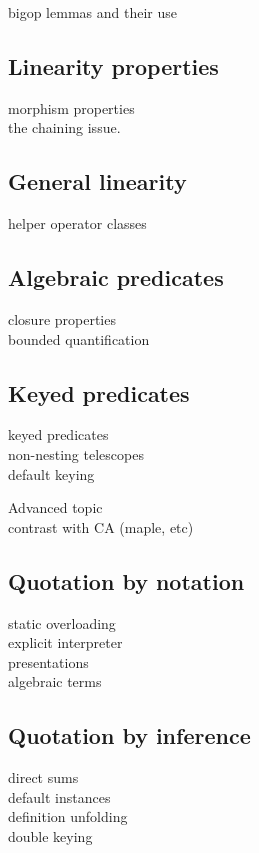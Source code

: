 bigop lemmas and their use

\subsection{Linearity properties}

morphism properties\\
the chaining issue.

\subsection{General linearity}

helper operator classes

\subsection{Algebraic predicates}

closure properties\\
bounded quantification

\subsection{Keyed predicates}

keyed predicates\\
non-nesting telescopes\\
default keying


Advanced topic\\
contrast with CA (maple, etc)

\subsection{Quotation by notation}

static overloading\\
explicit interpreter\\
presentations\\
algebraic terms

\subsection{Quotation by inference}

direct sums\\
default instances\\
definition unfolding\\
double keying


